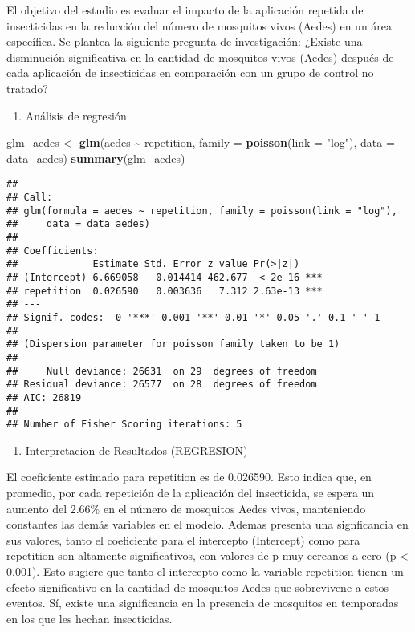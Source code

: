 \documentclass[
]{article}
\newenvironment{Shaded}{\begin{snugshade}}{\end{snugshade}}
\newcommand{\AttributeTok}[1]{\textcolor[rgb]{0.13,0.29,0.53}{#1}}
\newcommand{\FunctionTok}[1]{\textcolor[rgb]{0.13,0.29,0.53}{\textbf{#1}}}
\newcommand{\NormalTok}[1]{#1}
\newcommand{\OtherTok}[1]{\textcolor[rgb]{0.56,0.35,0.01}{#1}}
\newcommand{\SpecialCharTok}[1]{\textcolor[rgb]{0.81,0.36,0.00}{\textbf{#1}}}
\newcommand{\StringTok}[1]{\textcolor[rgb]{0.31,0.60,0.02}{#1}}
\providecommand{\tightlist}{%
  \setlength{\itemsep}{0pt}\setlength{\parskip}{0pt}}
\begin{document}
El objetivo del estudio es evaluar el impacto de la aplicación repetida
de insecticidas en la reducción del número de mosquitos vivos (Aedes) en
un área específica. Se plantea la siguiente pregunta de investigación:
¿Existe una disminución significativa en la cantidad de mosquitos vivos
(Aedes) después de cada aplicación de insecticidas en comparación con un
grupo de control no tratado?

\begin{enumerate}
\def\labelenumi{\arabic{enumi}.}
\setcounter{enumi}{3}
\tightlist
\item
  Análisis de regresión
\end{enumerate}

\begin{Shaded}
\begin{Highlighting}[]
\NormalTok{glm\_aedes }\OtherTok{\textless{}{-}} \FunctionTok{glm}\NormalTok{(aedes }\SpecialCharTok{\textasciitilde{}}\NormalTok{ repetition, }\AttributeTok{family =} \FunctionTok{poisson}\NormalTok{(}\AttributeTok{link =} \StringTok{"log"}\NormalTok{), }\AttributeTok{data =}\NormalTok{ data\_aedes)}
\FunctionTok{summary}\NormalTok{(glm\_aedes)}
\end{Highlighting}
\end{Shaded}

\begin{verbatim}
## 
## Call:
## glm(formula = aedes ~ repetition, family = poisson(link = "log"), 
##     data = data_aedes)
## 
## Coefficients:
##             Estimate Std. Error z value Pr(>|z|)    
## (Intercept) 6.669058   0.014414 462.677  < 2e-16 ***
## repetition  0.026590   0.003636   7.312 2.63e-13 ***
## ---
## Signif. codes:  0 '***' 0.001 '**' 0.01 '*' 0.05 '.' 0.1 ' ' 1
## 
## (Dispersion parameter for poisson family taken to be 1)
## 
##     Null deviance: 26631  on 29  degrees of freedom
## Residual deviance: 26577  on 28  degrees of freedom
## AIC: 26819
## 
## Number of Fisher Scoring iterations: 5
\end{verbatim}

\begin{enumerate}
\def\labelenumi{\arabic{enumi}.}
\setcounter{enumi}{4}
\tightlist
\item
  Interpretacion de Resultados (REGRESION)
\end{enumerate}

El coeficiente estimado para repetition es de 0.026590. Esto indica que,
en promedio, por cada repetición de la aplicación del insecticida, se
espera un aumento del 2.66\% en el número de mosquitos Aedes vivos,
manteniendo constantes las demás variables en el modelo. Ademas presenta
una signficancia en sus valores, tanto el coeficiente para el intercepto
(Intercept) como para repetition son altamente significativos, con
valores de p muy cercanos a cero (p \textless{} 0.001). Esto sugiere que
tanto el intercepto como la variable repetition tienen un efecto
significativo en la cantidad de mosquitos Aedes que sobrevivene a estos
eventos. Sí, existe una significancia en la presencia de mosquitos en
temporadas en los que les hechan insecticidas.
\end{document}
